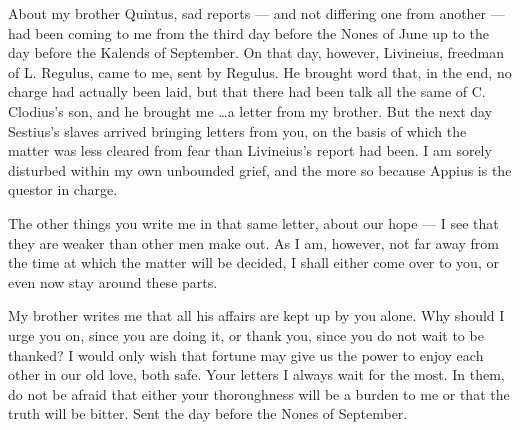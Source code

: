 

 About my brother Quintus, sad reports --- and not differing one from another --- had been coming to me from the third day before the Nones of June up to the day before the Kalends of September. On that day, however, Livineius, freedman of L. Regulus, came to me, sent by Regulus. He brought word that, in the end, no charge had actually been laid, but that there had been talk all the same of C. Clodius's son, and he brought me \textdagger\ldots\textdagger a letter from my brother. But the next day Sestius's slaves arrived bringing letters from you, on the basis of which the matter was less cleared from fear than Livineius's report had been. I am sorely disturbed within my own unbounded grief, and the more so because Appius is the questor in charge.

 The other things you write me in that same letter, about our hope --- I see that they are weaker than other men make out. As I am, however, not far away from the time at which the matter will be decided, I shall either come over to you, or even now stay around these parts.

 My brother writes me that all his affairs are kept up by you alone. Why should I urge you on, since you are doing it, or thank you, since you do not wait to be thanked? I would only wish that fortune may give us the power to enjoy each other in our old love, both safe. Your letters I always wait for the most. In them, do not be afraid that either your thoroughness will be a burden to me or that the truth will be bitter. Sent the day before the Nones of September.
